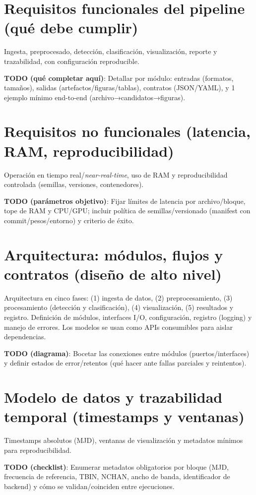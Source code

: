 
\section{Requisitos funcionales del pipeline (qué debe cumplir)}
Ingesta, preprocesado, detección, clasificación, visualización, reporte y trazabilidad, con configuración reproducible.

\textbf{TODO (qué completar aquí)}: Detallar por módulo: entradas (formatos, tamaños), salidas (artefactos/figuras/tablas), contratos (JSON/YAML), y 1 ejemplo mínimo end-to-end (archivo→candidatos→figuras).

\section{Requisitos no funcionales (latencia, RAM, reproducibilidad)}
Operación en tiempo real/\textit{near-real-time}, uso de RAM y reproducibilidad controlada (semillas, versiones, contenedores).

\textbf{TODO (parámetros objetivo)}: Fijar límites de latencia por archivo/bloque, tope de RAM y CPU/GPU; incluir política de semillas/versionado (manifest con commit/pesos/entorno) y criterio de éxito.

\section{Arquitectura: módulos, flujos y contratos (diseño de alto nivel)}
Arquitectura en cinco fases: (1) ingesta de datos, (2) preprocesamiento, (3) procesamiento (detección y clasificación), (4) visualización, (5) resultados y registro. 
Definición de módulos, interfaces I/O, configuración, registro (logging) y manejo de errores. Los modelos se usan como APIs consumibles para aislar dependencias.

\textbf{TODO (diagrama)}: Bocetar las conexiones entre módulos (puertos/interfaces) y definir estados de error/retentos (qué hacer ante fallas parciales y reintentos).

\section{Modelo de datos y trazabilidad temporal (timestamps y ventanas)}
Timestamps absolutos (MJD), ventanas de visualización y metadatos mínimos para reproducibilidad.

\textbf{TODO (checklist)}: Enumerar metadatos obligatorios por bloque (MJD, frecuencia de referencia, TBIN, NCHAN, ancho de banda, identificador de backend) y cómo se validan/coinciden entre ejecuciones.

